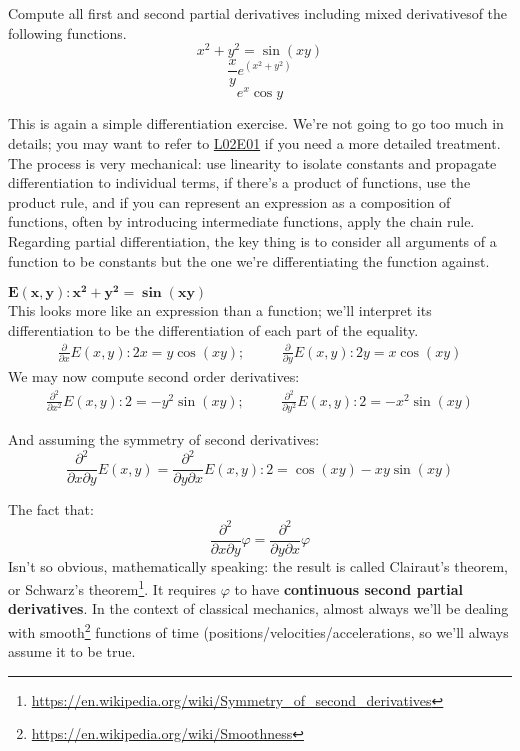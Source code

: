 \documentclass[solutions.tex]{subfiles}
\begin{document}
\maketitle
\begin{exercise} Compute all first and second partial derivatives
\textemdash including mixed derivatives\textemdash of the following
functions.
\[ x^2+y^2 = \sin(xy) \]
\[ \frac{x}ye^{(x^2+y^2)} \]
\[ e^x\cos y \]
\end{exercise}
This is again a simple differentiation exercise. We're not going to
go too much in details; you may want to refer to
\href{https://github.com/mbivert/ttm/blob/master/cm/L02E01.pdf}{L02E01}
if you need a more detailed treatment. The process is very mechanical:
use linearity to isolate constants and propagate differentiation to individual
terms, if there's a product of functions, use the product rule, and if
you can represent an expression as a composition of functions, often by
introducing intermediate functions, apply the chain rule. \\

Regarding partial differentiation, the key thing is to consider all
arguments of a function to be constants but the one we're differentiating
the function against.

\hr
$\bm{E(x,y): x^2+y^2 = \sin(xy)}$\\
This looks more like an expression than a function; we'll interpret
its differentiation to be the differentiation of each part of the equality.
\begin{equation*} \begin{aligned}
	\boxed{\frac{\partial}{\partial x}E(x,y) : 2x  =y\cos(xy);} &\quad&
	\boxed{\frac{\partial}{\partial y}E(x,y) : 2y  =x\cos(xy)}
\end{aligned} \end{equation*}
We may now compute second order derivatives:
\begin{equation*} \begin{aligned}
	\boxed{\frac{\partial^2}{\partial x^2}E(x,y) : 2  =-y^2\sin(xy);} &\quad&
	\boxed{\frac{\partial^2}{\partial y^2}E(x,y) : 2  =-x^2\sin(xy)}
\end{aligned} \end{equation*}

And assuming the symmetry of second derivatives:
\[
	\frac{\partial^2}{\partial x\partial y}E(x,y)
	= \frac{\partial^2}{\partial y\partial x} E(x,y) :
	\boxed{2  =\cos(xy)-xy\sin(xy)}
\]

\begin{remark} The fact that:
\[
	\frac{\partial^2}{\partial x\partial y}\varphi
	= \frac{\partial^2}{\partial y\partial x}\varphi
\]
Isn't so obvious, mathematically speaking: the result is called
Clairaut's theorem, or Schwarz's theorem\footnote{
\url{https://en.wikipedia.org/wiki/Symmetry\_of\_second\_derivatives}}.
It requires $\varphi$ to have \textbf{continuous second partial derivatives}.
In the context of classical mechanics, almost always we'll be dealing
with smooth\footnote{\url{https://en.wikipedia.org/wiki/Smoothness}}
functions of time (positions/velocities/accelerations, so we'll always
assume it to be true.
\end{remark}
\end{document}

